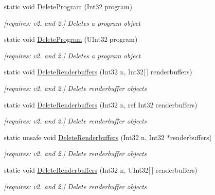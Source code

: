\begin{DoxyCompactItemize}
static void \hyperlink{class_open_t_k_1_1_graphics_1_1_e_s20_1_1_g_l_a19f389432e432dd9e9e0cdd2b91966da}{Delete\-Program} (Int32 program)
\begin{DoxyCompactList}\small\item\em \mbox{[}requires\-: v2. and 2.\mbox{]} Deletes a program object \end{DoxyCompactList}\item 
static void \hyperlink{class_open_t_k_1_1_graphics_1_1_e_s20_1_1_g_l_a206314ad12a340176d11fb560e37dee1}{Delete\-Program} (U\-Int32 program)
\begin{DoxyCompactList}\small\item\em \mbox{[}requires\-: v2. and 2.\mbox{]} Deletes a program object \end{DoxyCompactList}\item 
static void \hyperlink{class_open_t_k_1_1_graphics_1_1_e_s20_1_1_g_l_a5bb5cf3589a9859a85af2c0bfacb2920}{Delete\-Renderbuffers} (Int32 n, Int32\mbox{[}$\,$\mbox{]} renderbuffers)
\begin{DoxyCompactList}\small\item\em \mbox{[}requires\-: v2. and 2.\mbox{]} Delete renderbuffer objects \end{DoxyCompactList}\item 
static void \hyperlink{class_open_t_k_1_1_graphics_1_1_e_s20_1_1_g_l_ac17b6c5f9d0c0de23a4d03bcef75b075}{Delete\-Renderbuffers} (Int32 n, ref Int32 renderbuffers)
\begin{DoxyCompactList}\small\item\em \mbox{[}requires\-: v2. and 2.\mbox{]} Delete renderbuffer objects \end{DoxyCompactList}\item 
static unsafe void \hyperlink{class_open_t_k_1_1_graphics_1_1_e_s20_1_1_g_l_aac81db8db7fbdb6aeccaeb5213b98bd0}{Delete\-Renderbuffers} (Int32 n, Int32 $\ast$renderbuffers)
\begin{DoxyCompactList}\small\item\em \mbox{[}requires\-: v2. and 2.\mbox{]} Delete renderbuffer objects \end{DoxyCompactList}\item 
static void \hyperlink{class_open_t_k_1_1_graphics_1_1_e_s20_1_1_g_l_aa9091385526f3b322157d9ae03917305}{Delete\-Renderbuffers} (Int32 n, U\-Int32\mbox{[}$\,$\mbox{]} renderbuffers)
\begin{DoxyCompactList}\small\item\em \mbox{[}requires\-: v2. and 2.\mbox{]} Delete renderbuffer objects \end{DoxyCompactList}\item 

\end{DoxyCompactItemize}
